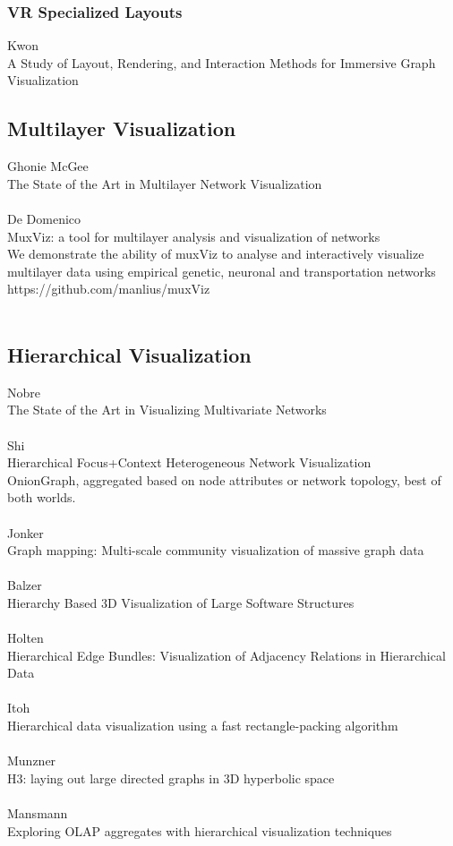 \subsubsection{VR Specialized Layouts}
Kwon\\
A Study of Layout, Rendering, and Interaction Methods for Immersive Graph Visualization\\


\subsection{Multilayer Visualization}
Ghonie McGee\\
The State of the Art in Multilayer Network Visualization\\
\\
De Domenico\\
MuxViz: a tool for multilayer analysis and visualization of networks\\
We demonstrate the ability of muxViz to analyse and interactively visualize multilayer data using empirical genetic, neuronal and transportation networks https://github.com/manlius/muxViz\\
\\

\subsection{Hierarchical Visualization}
Nobre\\
The State of the Art in Visualizing Multivariate Networks\\
\\
Shi\\
Hierarchical Focus+Context Heterogeneous Network Visualization\\
OnionGraph, aggregated based on node attributes or network topology,
best of both worlds.\\
\\
Jonker\\
Graph mapping: Multi-scale community visualization of massive graph data\\
\\
Balzer\\
Hierarchy Based 3D Visualization of Large Software Structures\\
\\
Holten\\
Hierarchical Edge Bundles: Visualization of Adjacency Relations in Hierarchical Data\\
\\
Itoh\\
Hierarchical data visualization using a fast rectangle-packing algorithm\\
\\
Munzner\\
H3: laying out large directed graphs in 3D hyperbolic space\\
\\
Mansmann\\
Exploring OLAP aggregates with hierarchical visualization techniques\\
\\

